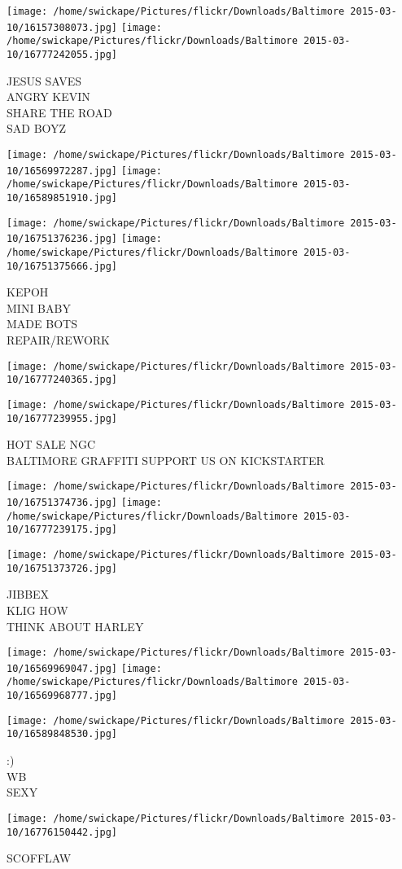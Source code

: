 \documentclass[10pt,letterpaper]{article}
\begin{document}
\texttt{[image: /home/swickape/Pictures/flickr/Downloads/Baltimore 2015-03-10/16157308073.jpg]}
\texttt{[image: /home/swickape/Pictures/flickr/Downloads/Baltimore 2015-03-10/16777242055.jpg]}

JESUS SAVES\\
ANGRY KEVIN\\
SHARE THE ROAD\\
SAD BOYZ\\
\pagebreak

\texttt{[image: /home/swickape/Pictures/flickr/Downloads/Baltimore 2015-03-10/16569972287.jpg]}
\texttt{[image: /home/swickape/Pictures/flickr/Downloads/Baltimore 2015-03-10/16589851910.jpg]}

\texttt{[image: /home/swickape/Pictures/flickr/Downloads/Baltimore 2015-03-10/16751376236.jpg]}
\texttt{[image: /home/swickape/Pictures/flickr/Downloads/Baltimore 2015-03-10/16751375666.jpg]}

KEPOH\\
MINI BABY\\
MADE BOTS\\
REPAIR/REWORK\\
\pagebreak

\texttt{[image: /home/swickape/Pictures/flickr/Downloads/Baltimore 2015-03-10/16777240365.jpg]}

\vspace{0.25in}
\texttt{[image: /home/swickape/Pictures/flickr/Downloads/Baltimore 2015-03-10/16777239955.jpg]}

HOT SALE NGC\\
BALTIMORE GRAFFITI SUPPORT US ON KICKSTARTER\\
\pagebreak

\texttt{[image: /home/swickape/Pictures/flickr/Downloads/Baltimore 2015-03-10/16751374736.jpg]}
\texttt{[image: /home/swickape/Pictures/flickr/Downloads/Baltimore 2015-03-10/16777239175.jpg]}

\vspace{0.25in}
\texttt{[image: /home/swickape/Pictures/flickr/Downloads/Baltimore 2015-03-10/16751373726.jpg]}

JIBBEX\\
KLIG HOW\\
THINK ABOUT HARLEY\\
\pagebreak

\texttt{[image: /home/swickape/Pictures/flickr/Downloads/Baltimore 2015-03-10/16569969047.jpg]}
\texttt{[image: /home/swickape/Pictures/flickr/Downloads/Baltimore 2015-03-10/16569968777.jpg]}

\texttt{[image: /home/swickape/Pictures/flickr/Downloads/Baltimore 2015-03-10/16589848530.jpg]}

:)\\
WB\\
SEXY\\
\pagebreak

\texttt{[image: /home/swickape/Pictures/flickr/Downloads/Baltimore 2015-03-10/16776150442.jpg]}

SCOFFLAW\\
\pagebreak
\end{document}
